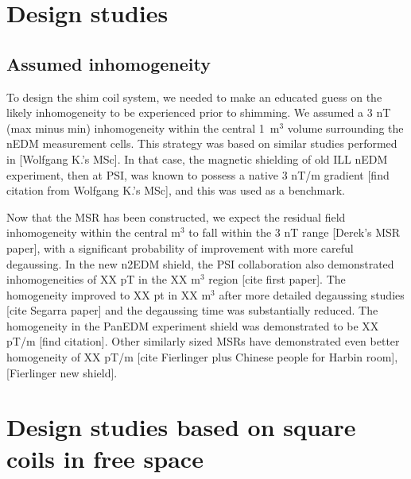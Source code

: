 \documentclass[preprint,12pt]{elsarticle}
\begin{document}
\section{Design studies}\label{sec:designstudies}

\subsection{Assumed inhomogeneity}

To design the shim coil system, we needed to make an educated guess on
the likely inhomogeneity to be experienced prior to shimming.  We
assumed a 3 nT (max minus min) inhomogeneity within the central
1~m$^3$ volume surrounding the nEDM measurement cells.  This strategy
was based on similar studies performed in [Wolfgang K.'s MSc].  In
that case, the magnetic shielding of old ILL nEDM experiment, then at
PSI, was known to possess a native 3 nT/m gradient [find citation from
  Wolfgang K.'s MSc], and this was used as a benchmark.

Now that the MSR has been constructed, we expect the residual field
inhomogeneity within the central m$^3$ to fall within the 3 nT range
[Derek's MSR paper], with a significant probability of improvement
with more careful degaussing.  In the new n2EDM shield, the PSI
collaboration also demonstrated inhomogeneities of XX pT in the XX
m$^3$ region [cite first paper].  The homogeneity improved to XX pt in
XX m$^3$ after more detailed degaussing studies [cite Segarra paper]
and the degaussing time was substantially reduced.  The homogeneity in
the PanEDM experiment shield was demonstrated to be XX pT/m [find
  citation].  Other similarly sized MSRs have demonstrated even better
homogeneity of XX pT/m [cite Fierlinger plus Chinese people for Harbin
  room], [Fierlinger new shield].

\section{Design studies based on square coils in free space}
\end{document}
